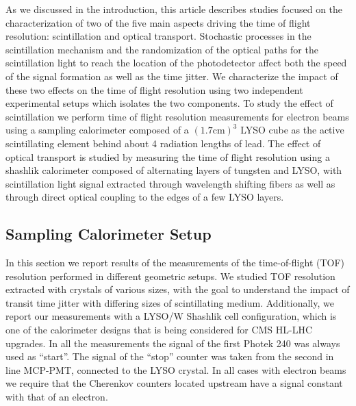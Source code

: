 \documentclass[11pt]{article}
\begin{document}
As we discussed in the introduction, this article describes studies
focused on the characterization of two of the five main aspects
driving the time of flight resolution: scintillation and 
optical transport. Stochastic processes in the scintillation
mechanism and the randomization of the optical paths for the 
scintillation light to reach the location of the photodetector 
affect both the speed of the signal formation
as well as the time jitter. We characterize the impact of
these two effects on the time of flight resolution using
two independent experimental setups which isolates the
two components. To study the effect of scintillation
we perform time of flight resolution measurements
for electron beams using a sampling calorimeter composed of a 
$(1.7\mathrm{ cm})^{3}$ LYSO cube as the active 
scintillating element behind about 4 radiation lengths of lead. 
The effect of optical transport is studied by measuring
the time of flight resolution using a shashlik 
calorimeter composed of alternating layers of tungsten
and LYSO, with scintillation light signal extracted
through wavelength shifting fibers as well as 
through direct optical coupling to the edges of a few
LYSO layers. 


\subsection{Sampling Calorimeter Setup}


In this section we report results of the
measurements of the time-of-flight (TOF) resolution performed in different
geometric setups. We studied TOF resolution extracted with crystals of various
sizes, with the goal to understand the impact of transit time jitter with
differing sizes of scintillating medium. Additionally, we report our
measurements with a LYSO/W Shashlik cell configuration, which is one of the
calorimeter designs that is being considered for CMS HL-LHC upgrades. In all the
measurements the signal of the first Photek 240 was always used as ``start''.
The signal of the ``stop'' counter was taken from the second in line MCP-PMT,
connected to the LYSO crystal. In all cases with electron beams we require that
the Cherenkov counters located upstream have a signal constant with that of an
electron. 
\end{document}
